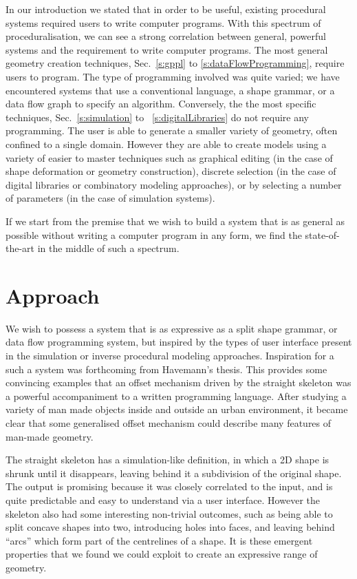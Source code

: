 In our introduction we stated that in order to be useful, existing procedural systems required users to write computer programs. With this spectrum of proceduralisation, we can see a strong correlation between general, powerful systems and the requirement to write computer programs. The most general geometry creation techniques, Sec.~\ref{s:gppl} to \ref{s:dataFlowProgramming}, require users to program. The type of programming involved was quite varied; we have encountered systems that use a conventional language, a shape grammar, or a data flow graph to specify an algorithm. Conversely, the the most specific techniques, Sec.~\ref{s:simulation} to ~\ref{s:digitalLibraries} do not require any programming. The user is able to generate a smaller variety of geometry, often confined to a single domain. However they are able to create models using a variety of easier to master techniques such as graphical editing (in the case of shape deformation or geometry construction), discrete selection (in the case of digital libraries or combinatory modeling approaches), or by selecting a number of parameters (in the case of simulation systems).

If we start from the premise that we wish to build a system that is as general as possible without writing a computer program in any form, we find the state-of-the-art in the middle of such a spectrum. 

\section{Approach}
\label{s:approachingTheMiddle}

We wish to possess a system that is as expressive as a split shape grammar, or data flow programming system, but inspired by the types of user interface present in the simulation or inverse procedural modeling approaches. Inspiration for a such a system was forthcoming from Havemann's thesis\cite{Havemann:2005:GMM}. This provides some convincing examples that an offset mechanism driven by the straight skeleton was a powerful accompaniment to a written programming language. After studying a variety of man made objects inside and outside an urban environment, it became clear that some generalised offset mechanism could describe many features of man-made geometry.

The straight skeleton has a simulation-like definition, in which a 2D shape is shrunk until it disappears, leaving behind it a subdivision of the original shape. The output is promising because it was closely correlated to the input, and is quite predictable and easy to understand via a user interface. However the skeleton also had some interesting non-trivial outcomes, such as being able to split concave shapes into two, introducing holes into faces, and leaving behind ``arcs'' which form part of the centrelines of a shape. It is these emergent properties that we found we could exploit to create an expressive range of geometry. 


